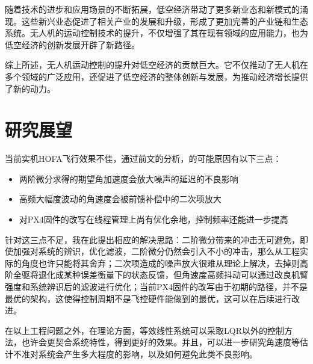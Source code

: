 随着技术的进步和应用场景的不断拓展，低空经济带动了更多新业态和新模式的涌现。这些新兴业态促进了相关产业的发展和升级，形成了更加完善的产业链和生态系统。无人机的运动控制技术的提升，不仅增强了其在现有领域的应用能力，也为低空经济的创新发展开辟了新路径。

综上所述，无人机运动控制的提升对低空经济的贡献巨大。它不仅推动了无人机在多个领域的广泛应用，还促进了低空经济的整体创新与发展，为推动经济增长提供了新的动力。
\section{研究展望}
当前实机HOFA飞行效果不佳，通过前文的分析，的可能原因有以下三点：
\begin{itemize}
  \item 两阶微分求得的期望角加速度会放大噪声的延迟的不良影响
  \item 高频大幅度波动的角速度会被前馈补偿中的二次项放大
  \item 对PX4固件的改写在线程管理上尚有优化余地，控制频率还能进一步提高
\end{itemize}
针对这三点不足，我在此提出相应的解决思路：二阶微分带来的冲击无可避免，即使加强对系统的辨识，优化滤波，二阶微分仍然会引入不小的冲击，那么从工程实际的角度也许只能将其舍弃；二次项造成的噪声放大很难从理论上解决，去掉则高阶全驱将退化成某种误差衡量下的状态反馈，但角速度高频抖动可以通过改良机臂强度和系统辨识后的滤波进行优化；当前PX4固件的改写由于初期的路径，并不是最优的架构，这使得控制周期不是飞控硬件能做到的最优，这可以在后续进行改进。

在以上工程问题之外，在理论方面，等效线性系统可以采取LQR以外的控制方法，也许会更契合系统特性，得到更好的效果。并且，可以进一步研究角速度等估计不准对系统会产生多大程度的影响，以及如何避免此类不良影响。